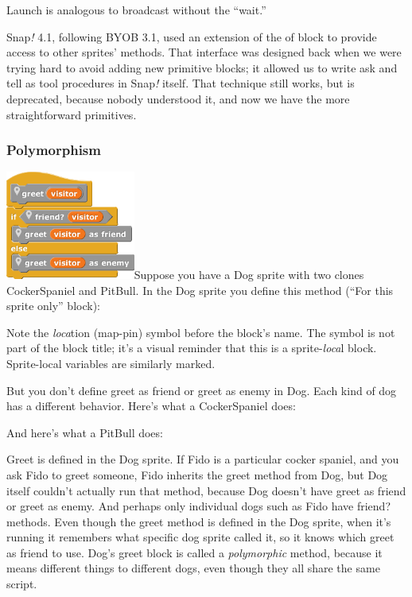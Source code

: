 Launch is analogous to broadcast without the ``wait.''

Snap\emph{!} 4.1, following BYOB 3.1, used an extension of the of block
to provide access to other sprites' methods. That interface was designed
back when we were trying hard to avoid adding new primitive blocks; it
allowed us to write ask and tell as tool procedures in Snap\emph{!}
itself. That technique still works, but is deprecated, because nobody
understood it, and now we have the more straightforward primitives.

\subsubsection{Polymorphism}\label{polymorphism}

\includegraphics[width=1.67361in,height=1.40208in]{media/image763.png}Suppose
you have a Dog sprite with two clones CockerSpaniel and PitBull. In the
Dog sprite you define this method (``For this sprite only'' block):

Note the \emph{loca}tion (map-pin) symbol before the block's name. The
symbol is not part of the block title; it's a visual reminder that this
is a sprite-\emph{loca}l block. Sprite-local variables are similarly
marked.

But you don't define greet as friend or greet as enemy in Dog. Each kind
of dog has a different behavior. Here's what a CockerSpaniel does:

And here's what a PitBull does:

Greet is defined in the Dog sprite. If Fido is a particular cocker
spaniel, and you ask Fido to greet someone, Fido inherits the greet
method from Dog, but Dog itself couldn't actually run that method,
because Dog doesn't have greet as friend or greet as enemy. And perhaps
only individual dogs such as Fido have friend? methods. Even though the
greet method is defined in the Dog sprite, when it's running it
remembers what specific dog sprite called it, so it knows which greet as
friend to use. Dog's greet block is called a \emph{polymorphic} method,
because it means different things to different dogs, even though they
all share the same script.

